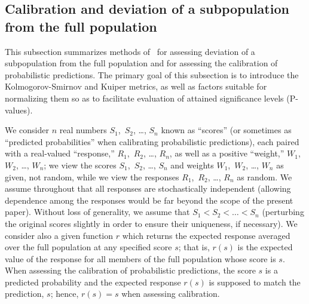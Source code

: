 \documentclass[12pt]{article}
\begin{document}
\subsection{Calibration and deviation of a subpopulation
from the full population}
\label{tygertsummary}

This subsection summarizes methods of~\citet{tygert_full}
for assessing deviation of a sub\-population from the full population
and for assessing the calibration of probabilistic predictions.
The primary goal of this subsection is to introduce the Kolmogorov-Smirnov
and Kuiper metrics, as well as factors suitable for normalizing them
so as to facilitate evaluation of attained significance levels (P-values).

We consider $n$ real numbers $S_1$,~$S_2$, \dots, $S_n$
known as ``scores'' (or sometimes as ``predicted probabilities''
when calibrating probabilistic predictions),
each paired with a real-valued ``response,'' $R_1$,~$R_2$, \dots, $R_n$,
as well as a positive ``weight,'' $W_1$,~$W_2$, \dots, $W_n$;
we view the scores $S_1$,~$S_2$, \dots, $S_n$
and weights $W_1$,~$W_2$, \dots, $W_n$ as given, not random,
while we view the responses $R_1$,~$R_2$, \dots, $R_n$ as random.
We assume throughout that all responses are stochastically independent
(allowing dependence among the responses would be far beyond the scope
of the present paper).
Without loss of generality, we assume that $S_1 < S_2 < \dots < S_n$
(perturbing the original scores slightly in order to ensure their uniqueness,
if necessary).
We consider also a given function $r$ which returns the expected response
averaged over the full population at any specified score $s$;
that is, $r(s)$ is the expected value of the response for all members
of the full population whose score is $s$.
When assessing the calibration of probabilistic predictions,
the score $s$ is a predicted probability and the expected response $r(s)$
is supposed to match the prediction, $s$; hence, $r(s) = s$
when assessing calibration.
\end{document}
